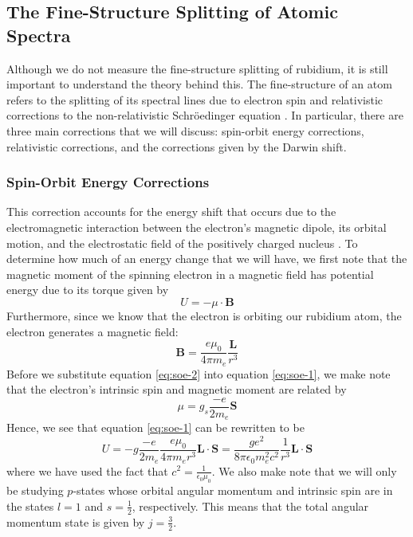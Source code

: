 \documentclass[twocolumn,amsmath,amssymb,pra, floatfix]{revtex4-2}
\begin{document}
\subsection{The Fine-Structure Splitting of Atomic Spectra}
Although we do not measure the fine-structure splitting of rubidium, it is still important to understand the theory behind this. The fine-structure of an atom refers to the splitting of its spectral lines due to electron spin and relativistic corrections to the non-relativistic Schr\"{o}edinger equation \cite{wiki:FineStructure}. In particular, there are three main corrections that we will discuss: spin-orbit energy corrections, relativistic corrections, and the corrections given by the Darwin shift.

\subsubsection{Spin-Orbit Energy Corrections}
This correction accounts for the energy shift that occurs due to the electromagnetic interaction between the electron's magnetic dipole, its orbital motion, and the electrostatic field of the positively charged nucleus \cite{wiki:SpinOrbitInteraction}. To determine how much of an energy change that we will have, we first note that the magnetic moment of the spinning electron in a magnetic field has potential energy due to its torque given by 
\begin{equation}
    U = - \mu \cdot \mathbf{B}
    \label{eq:soe-1}
\end{equation}
Furthermore, since we know that the electron is orbiting our rubidium atom, the electron generates a magnetic field:
\begin{equation}
    \mathbf{B}
    =
    \frac{ e \mu_{0} }{ 4 \pi m_{e} } \frac{ \mathbf{L} }{ r^{3} }
    \label{eq:soe-2}
\end{equation}
Before we substitute equation \ref{eq:soe-2} into equation \ref{eq:soe-1}, we make note that the electron's intrinsic spin and magnetic moment are related by 
\begin{equation}
    \mu = g_{s} \frac{- e}{2 m_{e}} \mathbf{S}
    \label{eq:soe-3}
\end{equation}
Hence, we see that equation \ref{eq:soe-1} can be rewritten to be 
\begin{equation}
    U 
    = 
    - g \frac{-e}{2 m_{e}} \frac{e \mu_{0}}{4 \pi m_{e} r^{3}} \mathbf{L} \cdot \mathbf{S}
    =
    \frac{g e^{2}}{8 \pi \epsilon_{0} m_{e}^{2} c^{2}} \frac{1}{r^{3}} \mathbf{L} \cdot \mathbf{S}
    \label{eq:soe-4}
\end{equation}
where we have used the fact that $c^{2} = \frac{1}{\epsilon_{0} \mu_{0}}$. We also make note that we will only be studying $p$-states whose orbital angular momentum and intrinsic spin are in the states $l = 1$ and $s = \frac{1}{2}$, respectively. This means that the total angular momentum state is given by $j = \frac{3}{2}$.
\end{document}
